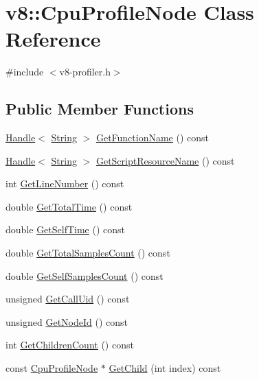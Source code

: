 \hypertarget{classv8_1_1_cpu_profile_node}{}\section{v8\+:\+:Cpu\+Profile\+Node Class Reference}
\label{classv8_1_1_cpu_profile_node}


{\ttfamily \#include $<$v8-\/profiler.\+h$>$}

\subsection*{Public Member Functions}
\begin{DoxyCompactItemize}
\item 
\hyperlink{classv8_1_1_handle}{Handle}$<$ \hyperlink{classv8_1_1_string}{String} $>$ \hyperlink{classv8_1_1_cpu_profile_node_affbc7842b66986012285602ab65aa5f8}{Get\+Function\+Name} () const 
\item 
\hyperlink{classv8_1_1_handle}{Handle}$<$ \hyperlink{classv8_1_1_string}{String} $>$ \hyperlink{classv8_1_1_cpu_profile_node_a140dd536e7096701a36be0083c18c268}{Get\+Script\+Resource\+Name} () const 
\item 
int \hyperlink{classv8_1_1_cpu_profile_node_a45ea035661c7152e4f3eb47f73787a75}{Get\+Line\+Number} () const 
\item 
double \hyperlink{classv8_1_1_cpu_profile_node_a49f16893b9f9c94c58ea845fb039330a}{Get\+Total\+Time} () const 
\item 
double \hyperlink{classv8_1_1_cpu_profile_node_aa2e4d36f22f49726715ed36fef5a23b6}{Get\+Self\+Time} () const 
\item 
double \hyperlink{classv8_1_1_cpu_profile_node_a0e719d2013377f03583342c28fb5cb27}{Get\+Total\+Samples\+Count} () const 
\item 
double \hyperlink{classv8_1_1_cpu_profile_node_a78537aa4471d6c1ebc37993f711090db}{Get\+Self\+Samples\+Count} () const 
\item 
unsigned \hyperlink{classv8_1_1_cpu_profile_node_a245092eb223b948fc9441664d9e2701e}{Get\+Call\+Uid} () const 
\item 
unsigned \hyperlink{classv8_1_1_cpu_profile_node_ae2971c5003353a984ef72b6cddf5e298}{Get\+Node\+Id} () const 
\item 
int \hyperlink{classv8_1_1_cpu_profile_node_ac4612b91e43a2901ac20c3705288955b}{Get\+Children\+Count} () const 
\item 
const \hyperlink{classv8_1_1_cpu_profile_node}{Cpu\+Profile\+Node} $\ast$ \hyperlink{classv8_1_1_cpu_profile_node_aa397db1e0f5147155164c5ea3e854d69}{Get\+Child} (int index) const 
\end{DoxyCompactItemize}
